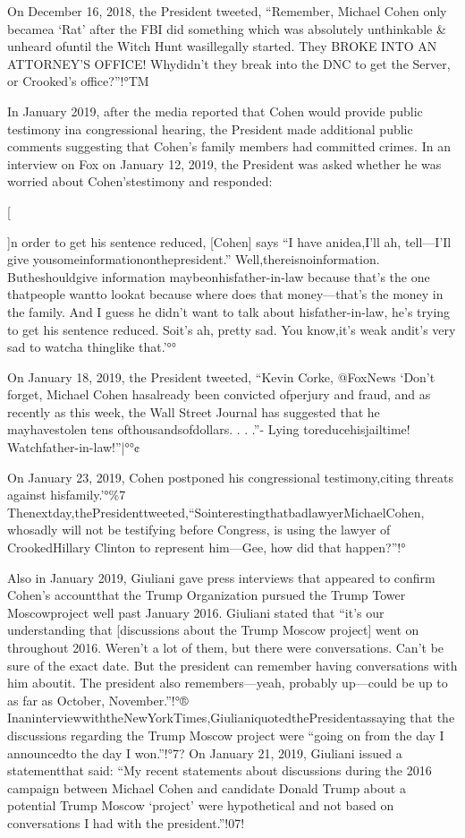 On December 16, 2018, the President tweeted, “Remember, Michael Cohen only becamea ‘Rat’ after the FBI did something which was absolutely unthinkable \& unheard ofuntil the Witch Hunt wasillegally started. They BROKE INTO AN ATTORNEY’S OFFICE! Whydidn’t they break into the DNC to get the Server, or Crooked’s office?”!°TM

In January 2019, after the media reported that Cohen would provide public testimony ina congressional hearing, the President made additional public comments suggesting that Cohen’s family members had committed crimes. In an interview on Fox on January 12, 2019, the President was asked whether he was worried about Cohen’stestimony and responded:

[{]n order to get his sentence reduced, [Cohen] says “I have anidea,I'll ah, tell—I’Il give yousomeinformationonthepresident.” Well,thereisnoinformation. Butheshouldgive information maybeonhisfather-in-law because that’s the one thatpeople wantto lookat because where does that money—that’s the money in the family. And I guess he didn’t want to talk about hisfather-in-law, he’s trying to get his sentence reduced. Soit’s ah, pretty sad. You know,it’s weak andit’s very sad to watcha thinglike that.'°°

On January 18, 2019, the President tweeted, “Kevin Corke, @FoxNews ‘Don’t forget, Michael Cohen hasalready been convicted ofperjury and fraud, and as recently as this week, the Wall Street Journal has suggested that he mayhavestolen tens ofthousandsofdollars. . . .”- Lying toreducehisjailtime! Watchfather-in-law!”|°°¢

On January 23, 2019, Cohen postponed his congressional testimony,citing threats against hisfamily.'°\%7 Thenextday,thePresidenttweeted,“SointerestingthatbadlawyerMichaelCohen, whosadly will not be testifying before Congress, is using the lawyer of CrookedHillary Clinton to represent him—Gee, how did that happen?”!°%

Also in January 2019, Giuliani gave press interviews that appeared to confirm Cohen’s accountthat the Trump Organization pursued the Trump Tower Moscowproject well past January 2016. Giuliani stated that “it’s our understanding that [discussions about the Trump Moscow project] went on throughout 2016. Weren’t a lot of them, but there were conversations. Can’t be sure of the exact date. But the president can remember having conversations with him aboutit.
The president also remembers—yeah, probably up—could be up to as far as October, November.”!°® InaninterviewwiththeNewYorkTimes,GiulianiquotedthePresidentassaying that the discussions regarding the Trump Moscow project were “going on from the day I announcedto the day I won.”!°7? On January 21, 2019, Giuliani issued a statementthat said: “My recent statements about discussions during the 2016 campaign between Michael Cohen and candidate Donald Trump about a potential Trump Moscow ‘project’ were hypothetical and not based on conversations I had with the president.”!07!

}
